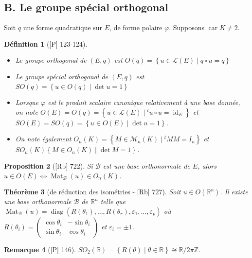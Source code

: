 \documentclass[10pt, a4paper, parskip=full, twoside, twocolumn]{report}
\newtheorem{definition}{Définition}
\newtheorem{theorem}[definition]{Théorème}
\newtheorem{proposition}[definition]{Proposition}
\newtheorem{remark}[definition]{Remarque}
\newcommand{\IZ}{\mathbb{Z}}
\newcommand{\IR}{\mathbb{R}}
\newcommand{\IRn}{\mathbb{R}^n}
\newcommand{\M}{\mathcal{M}}
\DeclareMathOperator{\Mat}{Mat}
\DeclareMathOperator{\id}{id}
\DeclareMathOperator{\diag}{diag}
\DeclareMathOperator{\car}{car}
\begin{document}
\subsection*{B. Le groupe spécial orthogonal}
Soit $q$ une forme quadratique sur $E$, de forme polaire $\varphi$. Supposons $\car K \neq 2$.

\begin{definition}[\textnormal{[P] 123-124}]
	\begin{itemize}
		\item Le \emph{groupe orthogonal} de $(E,q)$ est $O(q) = \left\{u\in\mathcal{L}(E)\mid q\circ u = q\right\}$
		\item Le \emph{groupe spécial orthogonal} de $(E,q)$ est $SO(q) = \left\{u\in O(q)\mid \det u = 1\right\}$
		\item Lorsque $\varphi$ est le produit scalaire canonique relativement à une base donnée, on note $O(E)=O(q)=\left\{u\in\mathcal{L}(E)\mid {}^tu\circ u = \id_E\right\}$ et $SO(E)=SO(q)=\left\{u\in O(E)\mid \det u = 1\right\}$.
		\item On note également $O_n(K) = \left\{M\in\M_n(K)\mid {}^tMM=I_n\right\}$ et $SO_n(K)  \left\{M\in O_n(K)\mid \det M = 1\right\}$.
	\end{itemize}
\end{definition}

\begin{proposition}[\textnormal{[Rb] 722}]
	Si $\mathcal{B}$ est une base orthonormale de $E$, alors $u\in O(E)\iff \Mat_{\mathcal{B}}(u)\in O_n(K)$.
\end{proposition}

\begin{theorem}[de réduction des isométries - \textnormal{[Rb] 727}]
	Soit $u\in O(\IRn)$. Il existe une base orthonormale $\mathcal{B}$ de $\IRn$ telle que $\Mat_{\mathcal{B}}(u)=\diag(R(\theta_1),\dots,R(\theta_r),\varepsilon_1,\dots,\varepsilon_p)$
	où $R(\theta_i) = \begin{pmatrix}
		\cos \theta_i & -\sin \theta_i \\
		\sin \theta_i & \cos \theta_i
	\end{pmatrix}$ et $\varepsilon_i = \pm 1$.
\end{theorem}

\begin{remark}[\textnormal{[P] 146}]
	$SO_2(\IR) = \left\{R(\theta)\mid \theta\in\IR\right\}\cong \IR/2\pi\IZ$.
\end{remark}
\end{document}
